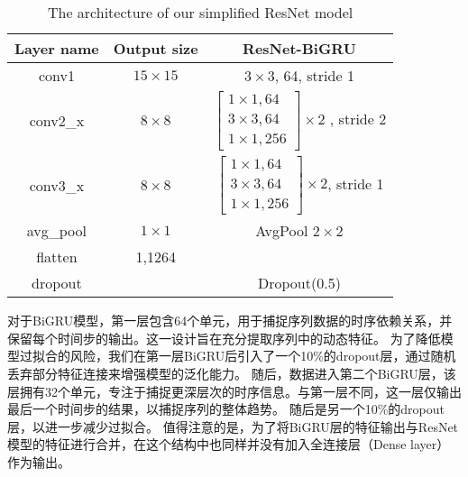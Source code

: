 \begin{table}[htbp]
  \label{tab:resnet_description}
  \caption{The architecture of our simplified ResNet model}
  \centering
  \begin{tabular}{c|c|c}
    \hline
  Layer name & Output size & ResNet-BiGRU \\
  \hline
  conv1 & $15 \times 15$ & $3\times3$, 64, stride 1 \\
  \hline
  \multirow{4}{*}{conv2\_x} & \multirow{4}{*}{\centering $8 \times 8$} &
  \multirow{4}{*}{$\left[\begin{array}{c}
      1 \times 1, 64 \\
      3 \times 3, 64 \\
      1 \times 1, 256 
  \end{array}\right] \times 2$ , stride 2} \\
  &&\\
  &&\\
  &&\\
  \hline
  \multirow{4}{*}{conv3\_x} & \multirow{4}{*}{\centering $8 \times 8$} &
  \multirow{4}{*}{$\left[\begin{array}{c}
    1 \times 1, 64 \\
    3 \times 3, 64 \\
    1 \times 1, 256 
  \end{array}\right] \times 2$, stride 1} \\
  &&\\
  &&\\
  &&\\
  \hline
  avg\_pool & $1 \times 1$ & AvgPool $2 \times 2$ \\
  \hline
  flatten &1,1264&  \\
  \hline
  dropout & & Dropout(0.5) \\
  \hline
  \end{tabular}
\end{table}


对于BiGRU模型，第一层包含64个单元，用于捕捉序列数据的时序依赖关系，并保留每个时间步的输出。这一设计旨在充分提取序列中的动态特征。
为了降低模型过拟合的风险，我们在第一层BiGRU后引入了一个10\%的dropout层，通过随机丢弃部分特征连接来增强模型的泛化能力。
随后，数据进入第二个BiGRU层，该层拥有32个单元，专注于捕捉更深层次的时序信息。与第一层不同，这一层仅输出最后一个时间步的结果，以捕捉序列的整体趋势。
随后是另一个10\%的dropout层，以进一步减少过拟合。
值得注意的是，为了将BiGRU层的特征输出与ResNet模型的特征进行合并，在这个结构中也同样并没有加入全连接层（Dense layer）作为输出。\par


